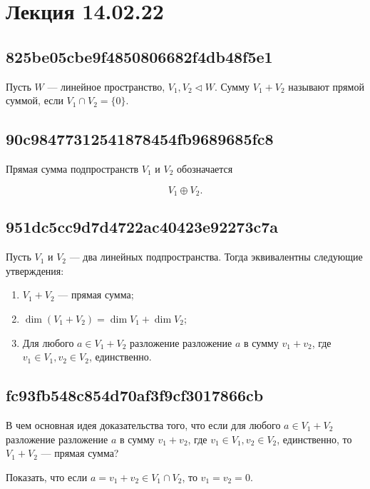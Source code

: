 \documentclass[11pt, a5paper]{article}
\let\oldsection\section
\renewcommand\section{\pagebreak\oldsection}
\newenvironment{note}[1]{\goodbreak\par\subsection{\hfill \color{lightgray}\tiny #1}}{}
\newenvironment{cloze}[2][\ldots]{\begin{leftbar}}{\end{leftbar}}
\newenvironment{icloze}[2][\ldots]{%
  \ignorespaces\text{\tiny \color{lightgray} \{\{c#2::}\hspace{0pt}%
}{%
  \hspace{0pt}\text{\tiny \color{lightgray}\}\}}\unskip%
}
\begin{document}
\section{Лекция 14.02.22}
\begin{note}{825be05cbe9f4850806682f4db48f5e1}
    Пусть \( W \) --- линейное пространство, \( V_1, V_2 \triangleleft W \).
    \begin{icloze}{2}Сумму \( V_1 + V_2 \)\end{icloze} называют \begin{icloze}{1}прямой сум\-мой,\end{icloze} если \begin{icloze}{2}\( V_1 \cap V_2 = \{ 0 \} \).\end{icloze}
\end{note}

\begin{note}{90c98477312541878454fb9689685fc8}
    \begin{icloze}{2}Прямая сумма подпространств \( V_1 \) и \( V_2 \)\end{icloze} обозначается \begin{icloze}{1}
        \[
            V_1 \oplus V_2.
        \]
    \end{icloze}
\end{note}

\begin{note}{951dc5cc9d7d4722ac40423e92273c7a}
    Пусть \( V_1 \) и \( V_2 \) --- два линейных подпространства. Тогда эквивалентны следующие утверждения:
    \begin{enumerate}
        \item {}\begin{icloze}{1}\( V_1 + V_2 \) --- прямая сумма;\end{icloze}
        \item {}\begin{icloze}{2}\( \dim (V_1 + V_2) = \dim V_1 + \dim V_2 \);\end{icloze}
        \item {}\begin{icloze}{3}Для любого \( a \in V_1 + V_2 \) разложение разложение \( a \) в сумму \( v_1 + v_2 \), где \( v_1 \in V_1, v_2 \in V_2 \), единственно.\end{icloze}
    \end{enumerate}
\end{note}

\begin{note}{fc93fb548c854d70af3f9cf3017866cb}
    В чем основная идея доказательства того, что если для любого \( a \in V_1 + V_2 \) разложение разложение \( a \) в сумму \( v_1 + v_2 \), где \( v_1 \in V_1, v_2 \in V_2 \), единственно, то \( V_1 + V_2 \) --- прямая сумма?

    \begin{cloze}{1}
        Показать, что если \( a = v_1 + v_2 \in V_1 \cap V_2 \), то \( v_1 = v_2 = 0 \).
    \end{cloze}
\end{note}
\end{document}
